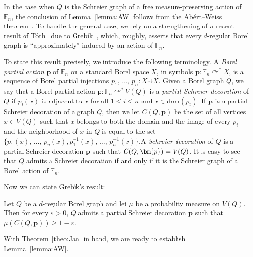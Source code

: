 \documentclass[AHL,Unicode,longabstracts,published]{cedram}
\newcommand{\0}{\varnothing}
\newcommand{\set}[1]{\{#1\}}
\renewcommand{\epsilon}{\varepsilon}
\renewcommand{\leq}{\leqslant}
\renewcommand{\geq}{\geqslant}
\newcommand{\pto}{\dashrightarrow}
\newcommand{\F}{\mathbb{F}}
\newcommand{\dom}{\mathrm{dom}}
\begin{document}
In the case when $Q$ is the Schreier graph of a free measure-preserving action of $\F_n$, the conclusion of Lemma~\ref{lemma:AW} follows from the Abért--Weiss theorem~\cite{AW}. To handle the general case, we rely on a strengthening of a recent result of Tóth~\cite{Toth} due to Greb\'ik~\cite{Jan}, which, roughly, asserts that every $d$-regular Borel graph is ``approximately'' induced by an action of $\F_n$.


To state this result precisely, we introduce the following terminology. A \emph{Borel partial action} $\bm{p}$ of $\F_n$ on a standard Borel space $X$, in symbols $\bm{p} \colon \F_n \curvearrowright^\ast X$, is a sequence of Borel partial injections $p_1,\,\ldots,\, p_n \colon X \pto X$. Given a Borel graph $Q$, we say that a Borel partial action $\bm{p} \colon \F_n \curvearrowright^\ast V(Q)$ is a \emph{partial Schreier decoration} of $Q$ if $p_i(x)$ is adjacent to $x$ for all $1 \leq i \leq n$ and $x \in \dom(p_i)$. If $\bm{p}$ is a partial Schreier decoration of a graph $Q$, then we let $C(Q, \bm{p})$ be the set of all vertices $x \in V(Q)$ such that $x$ belongs to both the domain and the image of every $p_i$ and the neighborhood of $x$ in $Q$ is equal to the set $\set{p_1(x),\, \ldots,\, p_n(x), p^{-1}_1(x), \,\ldots,\, p_n^{-1}(x)}$.\linebreak A \emph{Schreier decoration} of $Q$ is a partial Schreier decoration $\bm{p}$ such that $C(Q, \bm{p})\linebreak = V(Q)$. It is easy to see that $Q$ admits a Schreier decoration if and only if it is the Schreier graph of a Borel action of $\F_n$.

Now we can state Greb{\'\i}k's result:

\begin{theo}\label{theo:Jan}
Let $Q$ be a $d$-regular Borel graph and let $\mu$ be a probability measure on $V(Q)$. Then for every $\epsilon > 0$, $Q$ admits a partial Schreier decoration $\bm{p}$ such that $\mu(C(Q, \bm{p})) \geq 1 - \epsilon$.
\end{theo}

With Theorem~\ref{theo:Jan} in hand, we are ready to establish Lemma~\ref{lemma:AW}.
\end{document}
